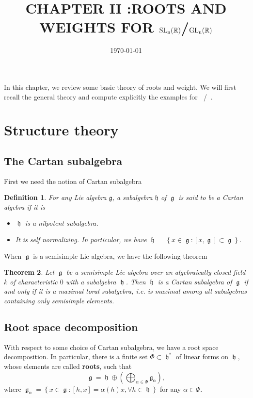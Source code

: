 \documentclass[12pt]{article} %
\title{CHAPTER II :ROOTS AND WEIGHTS FOR $\SLn$/$\GLn$} %
\date{\today} %
\newtheorem{definition}{Definition}[section]
\newtheorem{theorem}[definition]{Theorem}
\DeclareMathOperator{\SLn}{\text{SL}_n(\mathbb{R})}
\DeclareMathOperator{\GLn}{\text{GL}_n(\mathbb{R})}
\DeclareMathOperator{\fg}{\mathfrak{g}}
\DeclareMathOperator{\fh}{\mathfrak{h}}
\begin{document}
\maketitle
In this chapter, we review some basic theory of roots and weight. We will first recall the
general theory and compute explicitly the examples for $\SLn$/$\GLn$.
\section{Structure theory}
\subsection{The Cartan subalgebra}
First we need the notion of Cartan subalgebra
\begin{definition}
    For any Lie algebra $\mathfrak{g}$, a subalgebra $\mathfrak{h}$ of $\fg$ is said to be a \textit{Cartan algebra} if it is
    \begin{itemize}
        \item $\fh$ is a nilpotent subalgebra.
        \item It is self normalizing. In particular, we have $\fh = \left\lbrace x \in \fg : [x,\fg] \subset \fg\right\rbrace$.
    \end{itemize}
\end{definition}
When $\fg$ is a semisimple Lie algebra, we have the following theorem
\begin{theorem}
    Let $\fg$ be a semisimple Lie algebra over an algebraically closed field $k$ of characteristic $0$ with a subalgebra $\fh$.
    Then $\fh$ is a Cartan subalgebra of $\fg$ if and only if it is a maximal toral subalgebra, i.e. is maximal among all subalgebras
    containing only semisimple elements.
\end{theorem}
\subsection{Root space decomposition}
With respect to some choice of Cartan subalgebra, we have a root space decomposition. In particular, there is a finite set
$\Phi \subset \fh^{*}$ of linear forms on $\fh$, whose elements are called \textbf{roots}, such that
\[\fg = \fh \oplus \left(\bigoplus_{\alpha \in \Phi} \mathfrak{g}_\alpha\right),\]
where $\fg_\alpha = \left\lbrace x \in \fg: [h,x] = \alpha(h)x, \forall h \in \fh\right\rbrace$ for any $\alpha \in \Phi$.
\end{document}
